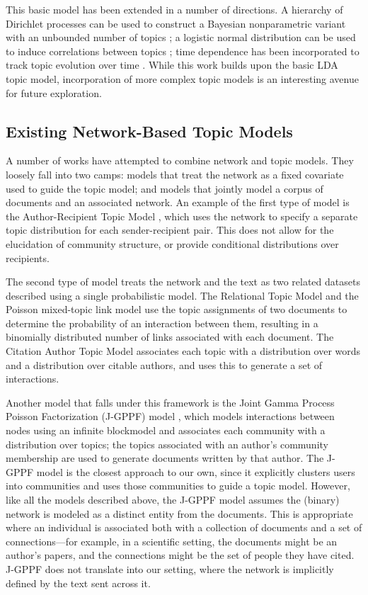         This basic model has been extended in a number of directions. A hierarchy of Dirichlet processes can be used to construct a Bayesian nonparametric variant with an unbounded number of topics \citep{Teh:2007}; a logistic normal distribution can be used to induce correlations between topics \citep{ctm}; time dependence has been incorporated to track topic evolution over time \citep{blei2006dynamic}. While this work builds upon the basic  LDA topic model, incorporation of more complex topic models is an interesting avenue for future exploration.
    
    \subsection{Existing Network-Based Topic Models}\label{sec:related}
    
        A number of works have attempted to combine network and topic models. 
        They loosely fall into two camps: models that treat the network as a fixed covariate used to guide the topic model; and models that jointly model a corpus of documents and an associated network. An example of the first type of model is the Author-Recipient Topic Model \citep{mccallum2005}, which uses the network to specify a separate  topic distribution for each sender-recipient pair. This does not allow for the elucidation of community structure, or provide conditional distributions over recipients.
        
        The second type of model treats the network and the text as two related datasets described using a single probabilistic model.
        The Relational Topic Model \citep{rtm} and the Poisson mixed-topic link model \citep{Zhu:Yan:Getoor:Moore:2013} use the topic assignments of two documents to determine the probability of an interaction between them, resulting in a binomially distributed number of links associated with each document. The Citation Author Topic Model \citep{tu2010} associates each topic with a distribution over words and a distribution over citable authors, and uses this to generate a set of interactions.
        
        Another model that falls under this framework is the Joint Gamma Process Poisson Factorization (J-GPPF) model \citep{acharya2015}, which models interactions between nodes using an infinite blockmodel and associates each community with a distribution over topics; the topics associated with an author's community membership are used to generate documents written by that author. The J-GPPF model is the closest approach to our own, since it explicitly clusters users into communities and uses those communities to guide a topic model. However, like all the models described above, the J-GPPF model assumes the (binary) network is modeled as a distinct entity from the documents. This is appropriate where an individual is associated both with a collection of documents and a set of connections---for example, in a scientific setting, the documents might be an author's papers, and the connections might be the set of people they have cited. J-GPPF does not translate into our setting, where the network is implicitly defined by the text sent across it.
    
